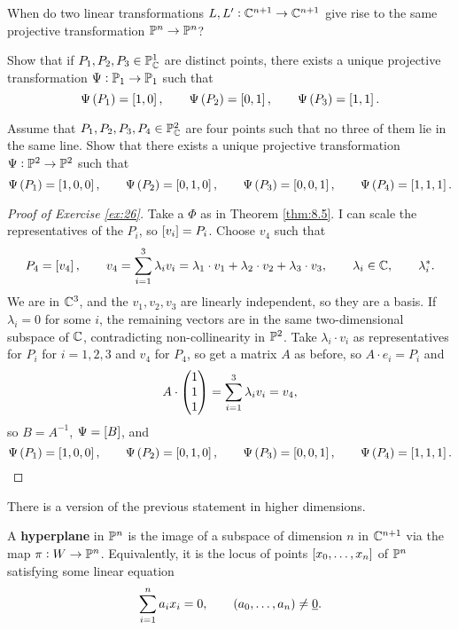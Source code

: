 \begin{exercise}
When do two linear transformations $ L, L' : \C^{n + 1} \to \C^{n + 1} $ give rise to the same projective transformation $ \P^n \to \P^n $?
\end{exercise}

\begin{exercise}
Show that if $ P_1, P_2, P_3 \in \P^1_\C $ are distinct points, there exists a unique projective transformation $ \Psi : \P_1 \to \P_1 $ such that
$$ \Psi\br{P_1} = \sbr{1, 0}, \qquad \Psi\br{P_2} = \sbr{0, 1}, \qquad \Psi\br{P_3} = \sbr{1, 1}. $$
\end{exercise}

\begin{exercise}
\label{ex:26}
Assume that $ P_1, P_2, P_3, P_4 \in \P^2_\C $ are four points such that no three of them lie in the same line. Show that there exists a unique projective transformation $ \Psi : \P^2 \to \P^2 $ such that
$$ \Psi\br{P_1} = \sbr{1, 0, 0}, \qquad \Psi\br{P_2} = \sbr{0, 1, 0}, \qquad \Psi\br{P_3} = \sbr{0, 0, 1}, \qquad \Psi\br{P_4} = \sbr{1, 1, 1}. $$
\end{exercise}

\pagebreak

\begin{proof}[Proof of Exercise \ref{ex:26}]
Take a $ \Phi $ as in Theorem \ref{thm:8.5}. I can scale the representatives of the $ P_i $, so $ \sbr{v_i} = P_i $. Choose $ v_4 $ such that
$$ P_4 = \sbr{v_4}, \qquad v_4 = \sum_{i = 1}^3 \lambda_i v_i = \lambda_1 \cdot v_1 + \lambda_2 \cdot v_2 + \lambda_3 \cdot v_3, \qquad \lambda_i \in \C, \qquad \lambda_i^*. $$
We are in $ \C^3 $, and the $ v_1, v_2, v_3 $ are linearly independent, so they are a basis. If $ \lambda_i = 0 $ for some $ i $, the remaining vectors are in the same two-dimensional subspace of $ \C $, contradicting non-collinearity in $ \P^2 $. Take $ \lambda_i \cdot v_i $ as representatives for $ P_i $ for $ i = 1, 2, 3 $ and $ v_4 $ for $ P_4 $, so get a matrix $ A $ as before, so $ A \cdot e_i = P_i $ and
$$ A \cdot \threebyone{1}{1}{1} = \sum_{i = 1}^3 \lambda_iv_i = v_4, $$
so $ B = A^{-1} $, $ \Psi = \sbr{B} $, and
$$ \Psi\br{P_1} = \sbr{1, 0, 0}, \qquad \Psi\br{P_2} = \sbr{0, 1, 0}, \qquad \Psi\br{P_3} = \sbr{0, 0, 1}, \qquad \Psi\br{P_4} = \sbr{1, 1, 1}. $$
\end{proof}

There is a version of the previous statement in higher dimensions.

\begin{definition}
A \textbf{hyperplane} in $ \P^n $ is the image of a subspace of dimension $ n $ in $ \C^{n + 1} $ via the map $ \pi : W \to \P^n $. Equivalently, it is the locus of points $ \sbr{x_0, \dots, x_n} $ of $ \P^n $ satisfying some linear equation
$$ \sum_{i = 1}^n a_ix_i = 0, \qquad \br{a_0, \dots, a_n} \ne \underline{0}. $$
\end{definition}

